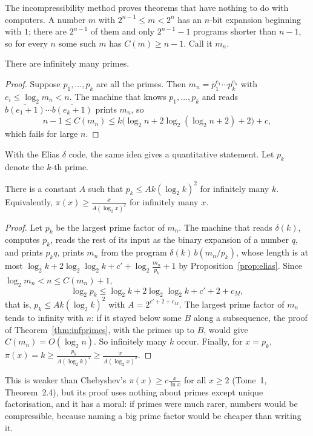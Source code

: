 The incompressibility method proves theorems that have nothing to do with computers. A number $m$ with $2^{n-1}\le m<2^n$ has an $n$-bit expansion beginning with $1$; there are $2^{n-1}$ of them and only $2^{n-1}-1$ programs shorter than $n-1$, so for every $n$ some such $m$ has $C(m)\ge n-1$. Call it $m_n$.

\begin{theorem}\label{thm:infprimes}
There are infinitely many primes.
\end{theorem}

\begin{proof}
Suppose $p_1,\dots,p_k$ are all the primes. Then $m_n=p_1^{e_1}\cdots p_k^{e_k}$ with $e_i\le\log_2m_n<n$. The machine that knows $p_1,\dots,p_k$ and reads $\overline{b(e_1+1)}\cdots\overline{b(e_k+1)}$ prints $m_n$, so
\[
n-1\le C(m_n)\le k\bigl(\log_2n+2\log_2(\log_2n+2)+2\bigr)+c,
\]
which fails for large $n$.
\end{proof}

With the Elias $\delta$ code, the same idea gives a quantitative statement. Let $p_k$ denote the $k$-th prime.

\begin{theorem}\label{thm:chebyshevK}
There is a constant $A$ such that $p_k\le Ak(\log_2k)^2$ for infinitely many $k$. Equivalently, $\pi(x)\ge\frac x{A(\log_2x)^2}$ for infinitely many $x$.
\end{theorem}

\begin{proof}
Let $p_k$ be the largest prime factor of $m_n$. The machine that reads $\delta(k)$, computes $p_k$, reads the rest of its input as the binary expansion of a number $q$, and prints $p_kq$, prints $m_n$ from the program $\delta(k)\,b(m_n/p_k)$, whose length is at most $\log_2k+2\log_2\log_2k+c'+\log_2\frac{m_n}{p_k}+1$ by Proposition~\ref{prop:elias}. Since $\log_2m_n<n\le C(m_n)+1$,
\[
\log_2p_k\le\log_2k+2\log_2\log_2k+c'+2+c_M,
\]
that is, $p_k\le Ak(\log_2k)^2$ with $A=2^{c'+2+c_M}$. The largest prime factor of $m_n$ tends to infinity with $n$: if it stayed below some $B$ along a subsequence, the proof of Theorem~\ref{thm:infprimes}, with the primes up to $B$, would give $C(m_n)=O(\log_2n)$. So infinitely many $k$ occur. Finally, for $x=p_k$, $\pi(x)=k\ge\frac{p_k}{A(\log_2k)^2}\ge\frac x{A(\log_2x)^2}$.
\end{proof}

This is weaker than Chebyshev's $\pi(x)\ge c\frac x{\ln x}$ for all $x\ge2$ (Tome~1, Theorem~2.4), but its proof uses nothing about primes except unique factorisation, and it has a moral: if primes were much rarer, numbers would be compressible, because naming a big prime factor would be cheaper than writing it.

